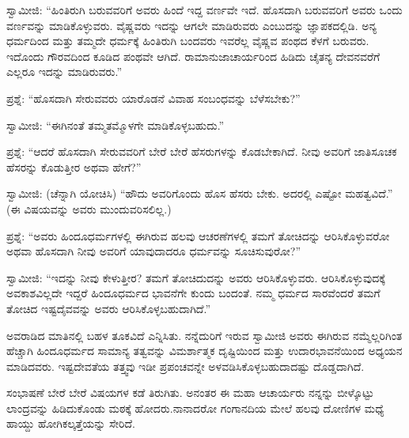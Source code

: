 ಸ್ವಾಮೀಜಿ: “ಹಿಂತಿರುಗಿ ಬರುವವರಿಗೆ ಅವರು ಹಿಂದೆ ಇದ್ದ ವರ್ಣವೇ ಇದೆ. ಹೊಸದಾಗಿ ಬರುವವರಿಗೆ ಅವರು ಒಂದು ವರ್ಣವನ್ನು ಮಾಡಿಕೊಳ್ಳುವರು. ವೈಷ್ಣವರು ಇದನ್ನು ಆಗಲೇ ಮಾಡಿರುವರು ಎಂಬುದನ್ನು ಜ್ಞಾಪಕದಲ್ಲಿಡಿ. ಅನ್ಯ ಧರ್ಮದಿಂದ ಮತ್ತು ತಮ್ಮದೇ ಧರ್ಮಕ್ಕೆ ಹಿಂತಿರುಗಿ ಬಂದವರು ಇವರೆಲ್ಲ ವೈಷ್ಣವ ಪಂಥದ ಕೆಳಗೆ ಬರುವರು. ಇದೊಂದು ಗೌರವದಿಂದ ಕೂಡಿದ ಪಂಥವೇ ಆಗಿದೆ. ರಾಮಾನುಜಾಚಾರ್ಯರಿಂದ ಹಿಡಿದು ಚೈತನ್ಯ ದೇವನವರೆಗೆ ಎಲ್ಲರೂ ಇದನ್ನು ಮಾಡಿರುವರು.”

ಪ್ರಶ್ನೆ: “ಹೊಸದಾಗಿ ಸೇರುವವರು ಯಾರೊಡನೆ ವಿವಾಹ ಸಂಬಂಧವನ್ನು ಬೆಳೆಸಬೇಕು?”

ಸ್ವಾಮೀಜಿ: “ಈಗಿನಂತೆ ತಮ್ಮತಮ್ಮೊಳಗೇ ಮಾಡಿಕೊಳ್ಳಬಹುದು.”

ಪ್ರಶ್ನೆ: “ಆದರೆ ಹೊಸದಾಗಿ ಸೇರುವವರಿಗೆ ಬೇರೆ ಬೇರೆ ಹೆಸರುಗಳನ್ನು ಕೊಡಬೇಕಾಗಿದೆ. ನೀವು ಅವರಿಗೆ ಜಾತಿಸೂಚಕ ಹೆಸರನ್ನು ಕೊಡುತ್ತೀರ ಅಥವಾ ಹೇಗೆ?”

ಸ್ವಾಮೀಜಿ: (ಚೆನ್ನಾಗಿ ಯೋಚಿಸಿ) “ಹೌದು ಅವರಿಗೊಂದು ಹೊಸ ಹೆಸರು ಬೇಕು. ಅದರಲ್ಲಿ ಎಷ್ಟೋ ಮಹತ್ವವಿದೆ.” (ಈ ವಿಷಯವನ್ನು ಅವರು ಮುಂದುವರಿಸಲಿಲ್ಲ.)

ಪ್ರಶ್ನೆ: “ಅವರು ಹಿಂದೂಧರ್ಮಗಳಲ್ಲಿ ಈಗಿರುವ ಹಲವು ಆಚರಣೆಗಳಲ್ಲಿ ತಮಗೆ ತೋಚಿದನ್ನು ಆರಿಸಿಕೊಳ್ಳುವರೋ ಅಥವಾ ಹೊಸದಾಗಿ ನೀವು ಅವರಿಗೆ ಯಾವುದಾದರೂ ಧರ್ಮವನ್ನು ಸೂಚಿಸುವುರೋ?”

ಸ್ವಾಮೀಜಿ: “ಇದನ್ನು ನೀವು ಕೇಳುತ್ತೀರ? ತಮಗೆ ತೋಚಿದುದನ್ನು ಅವರು ಆರಿಸಿಕೊಳ್ಳುವರು. ಆರಿಸಿಕೊಳ್ಳುವುದಕ್ಕೆ ಅವಕಾಶವಿಲ್ಲದೇ ಇದ್ದರೆ ಹಿಂದೂಧರ್ಮದ ಭಾವನೆಗೇ ಕುಂದು ಬಂದಂತೆ. ನಮ್ಮ ಧರ್ಮದ ಸಾರವೆಂದರೆ ತಮಗೆ ತೋಚಿದ ಇಷ್ಟದೈವವನ್ನು ಅವರು ಆರಿಸಿಕೊಳ್ಳಬಹುದಾಗಿದೆ.”

\eject

ಅವರಾಡಿದ ಮಾತಿನಲ್ಲಿ ಬಹಳ ತೂಕವಿದೆ ಎನ್ನಿಸಿತು. ನನ್ನೆದುರಿಗೆ ಇರುವ ಸ್ವಾಮೀಜಿ ಅವರು ಈಗಿರುವ ನಮ್ಮೆಲ್ಲರಿಗಿಂತ ಹೆಚ್ಚಾಗಿ ಹಿಂದೂಧರ್ಮದ ಸಾಮಾನ್ಯ ತತ್ವವನ್ನು ವಿಮರ್ಶಾತ್ಮಕ ದೃಷ್ಟಿಯಿಂದ ಮತ್ತು ಉದಾರಭಾವನೆಯಿಂದ ಅಧ್ಯಯನ ಮಾಡಿದವರು. ಇಷ್ಟದೇವತೆಯ ತತ್ತ್ವವು ಇಡೀ ಪ್ರಪಂಚವನ್ನೇ ಅಳವಡಿಸಿಕೊಳ್ಳಬಹುದಾದಷ್ಟು ದೊಡ್ಡದಾಗಿದೆ.

ಸಂಭಾಷಣೆ ಬೇರೆ ಬೇರೆ ವಿಷಯಗಳ ಕಡೆ ತಿರುಗಿತು. ಅನಂತರ ಈ ಮಹಾ ಆಚಾರ್ಯರು ನನ್ನನ್ನು ಬೀಳ್ಕೊಟ್ಟು ಲಾಂದ್ರವನ್ನು ಹಿಡಿದುಕೊಂಡು ಮಠಕ್ಕೆ ಹೋದರು.\break ನಾನಾದರೋ ಗಂಗಾನದಿಯ ಮೇಲೆ ಹಲವು ದೋಣಿಗಳ ಮಧ್ಯೆ ಹಾಯ್ದು ಹೋಗಿ\break ಕಲ್ಕತ್ತೆಯನ್ನು ಸೇರಿದೆ.

